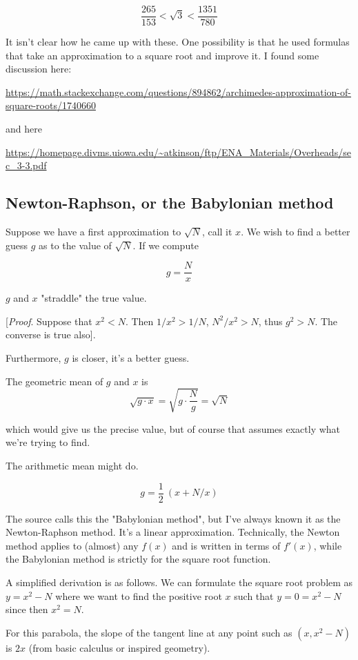 \documentclass[11pt, oneside]{article}
\begin{document}
\[ \frac{265}{153}  < \sqrt{3} < \frac{1351}{780} \]

It isn't clear how he came up with these.  One possibility is that he used formulas that take an approximation to a square root and improve it.  I found some discussion here:

\url{https://math.stackexchange.com/questions/894862/archimedes-approximation-of-square-roots/1740660}

and here

\url{https://homepage.divms.uiowa.edu/~atkinson/ftp/ENA_Materials/Overheads/sec_3-3.pdf}

\subsection*{Newton-Raphson, or the Babylonian method}

Suppose we have a first approximation to $\sqrt{N}$, call it $x$.  We wish to find a better guess $g$ as to the value of $\sqrt{N}$.  If we compute

\[ g = \frac{N}{x} \]

$g$ and $x$ "straddle" the true value.  

[\emph{Proof}.  Suppose that $x^2 < N$.  Then $1/x^2 > 1/N$, $N^2/x^2 > N$, thus $g^2 > N$.  The  converse is true also].

Furthermore, $g$ is closer, it's a better guess.

The geometric mean of $g$ and $x$ is
\[ \sqrt{g \cdot x} = \sqrt{g \cdot \frac{N}{g}} = \sqrt{N} \]

which would give us the precise value, but of course that assumes exactly what we're trying to find.  

The arithmetic mean might do.

\[ g = \frac{1}{2} \ (x + N/x) \]

The source calls this the "Babylonian method", but I've always known it as the Newton-Raphson method.  It's a linear approximation.  Technically, the Newton method applies to (almost) any $f(x)$ and is written in terms of $f'(x)$, while the Babylonian method is strictly for the square root function.

A simplified derivation is as follows.  We can formulate the square root problem as $y = x^2 - N$ where we want to find the positive root $x$ such that $y = 0 = x^2 - N$ since then $x^2 = N$.  

For this parabola, the slope of the tangent line at any point such as $(x, x^2-N)$ is $2x$ (from basic calculus or inspired geometry).  
\end{document}
